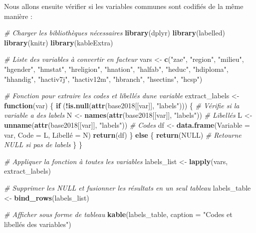 \documentclass[
]{article}
\newenvironment{Shaded}{\begin{snugshade}}{\end{snugshade}}
\newcommand{\AttributeTok}[1]{\textcolor[rgb]{0.13,0.29,0.53}{#1}}
\newcommand{\CommentTok}[1]{\textcolor[rgb]{0.56,0.35,0.01}{\textit{#1}}}
\newcommand{\ConstantTok}[1]{\textcolor[rgb]{0.56,0.35,0.01}{#1}}
\newcommand{\ControlFlowTok}[1]{\textcolor[rgb]{0.13,0.29,0.53}{\textbf{#1}}}
\newcommand{\FunctionTok}[1]{\textcolor[rgb]{0.13,0.29,0.53}{\textbf{#1}}}
\newcommand{\NormalTok}[1]{#1}
\newcommand{\OtherTok}[1]{\textcolor[rgb]{0.56,0.35,0.01}{#1}}
\newcommand{\SpecialCharTok}[1]{\textcolor[rgb]{0.81,0.36,0.00}{\textbf{#1}}}
\newcommand{\StringTok}[1]{\textcolor[rgb]{0.31,0.60,0.02}{#1}}
\begin{document}
Nous allons ensuite vérifier si les variables communes sont codifiés de
la même manière :

\begin{Shaded}
\begin{Highlighting}[]
\CommentTok{\# Charger les bibliothèques nécessaires}
\FunctionTok{library}\NormalTok{(dplyr)}
\FunctionTok{library}\NormalTok{(labelled)}
\FunctionTok{library}\NormalTok{(knitr)}
\FunctionTok{library}\NormalTok{(kableExtra)}

\CommentTok{\# Liste des variables à convertir en facteur}
\NormalTok{vars }\OtherTok{\textless{}{-}} \FunctionTok{c}\NormalTok{(}\StringTok{"zae"}\NormalTok{, }\StringTok{"region"}\NormalTok{, }\StringTok{"milieu"}\NormalTok{, }\StringTok{"hgender"}\NormalTok{, }\StringTok{"hmstat"}\NormalTok{, }\StringTok{"hreligion"}\NormalTok{, }\StringTok{"hnation"}\NormalTok{,}
          \StringTok{"halfab"}\NormalTok{, }\StringTok{"heduc"}\NormalTok{, }\StringTok{"hdiploma"}\NormalTok{, }\StringTok{"hhandig"}\NormalTok{, }\StringTok{"hactiv7j"}\NormalTok{, }\StringTok{"hactiv12m"}\NormalTok{, }
          \StringTok{"hbranch"}\NormalTok{, }\StringTok{"hsectins"}\NormalTok{, }\StringTok{"hcsp"}\NormalTok{)}


\CommentTok{\# Fonction pour extraire les codes et libellés d\textquotesingle{}une variable}
\NormalTok{extract\_labels }\OtherTok{\textless{}{-}} \ControlFlowTok{function}\NormalTok{(var) \{}
  \ControlFlowTok{if}\NormalTok{ (}\SpecialCharTok{!}\FunctionTok{is.null}\NormalTok{(}\FunctionTok{attr}\NormalTok{(base2018[[var]], }\StringTok{"labels"}\NormalTok{))) \{  }\CommentTok{\# Vérifie si la variable a des labels}
\NormalTok{    N }\OtherTok{\textless{}{-}} \FunctionTok{names}\NormalTok{(}\FunctionTok{attr}\NormalTok{(base2018[[var]], }\StringTok{"labels"}\NormalTok{))  }\CommentTok{\# Libellés}
\NormalTok{    L }\OtherTok{\textless{}{-}} \FunctionTok{unname}\NormalTok{(}\FunctionTok{attr}\NormalTok{(base2018[[var]], }\StringTok{"labels"}\NormalTok{)) }\CommentTok{\# Codes}
\NormalTok{    df }\OtherTok{\textless{}{-}} \FunctionTok{data.frame}\NormalTok{(}\AttributeTok{Variable =}\NormalTok{ var, }\AttributeTok{Code =}\NormalTok{ L, Libellé }\OtherTok{=}\NormalTok{ N)}
    \FunctionTok{return}\NormalTok{(df)}
\NormalTok{  \} }\ControlFlowTok{else}\NormalTok{ \{}
    \FunctionTok{return}\NormalTok{(}\ConstantTok{NULL}\NormalTok{) }\CommentTok{\# Retourne NULL si pas de labels}
\NormalTok{  \}}
\NormalTok{\}}

\CommentTok{\# Appliquer la fonction à toutes les variables}
\NormalTok{labels\_list }\OtherTok{\textless{}{-}} \FunctionTok{lapply}\NormalTok{(vars, extract\_labels)}

\CommentTok{\# Supprimer les NULL et fusionner les résultats en un seul tableau}
\NormalTok{labels\_table }\OtherTok{\textless{}{-}} \FunctionTok{bind\_rows}\NormalTok{(labels\_list)}

\CommentTok{\# Afficher sous forme de tableau}
\FunctionTok{kable}\NormalTok{(labels\_table, }\AttributeTok{caption =} \StringTok{"Codes et libellés des variables"}\NormalTok{)}
\end{Highlighting}
\end{Shaded}
\end{document}
